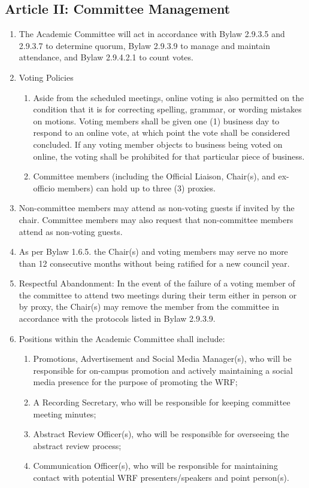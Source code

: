 \subsection{Article II: Committee Management}
\begin{enumerate}[label*=\arabic*., align=left]	
\item The Academic Committee will act in accordance with Bylaw 2.9.3.5 and 2.9.3.7 to determine quorum, Bylaw 2.9.3.9 to manage and maintain attendance, and Bylaw 2.9.4.2.1 to count votes.
\item Voting Policies
\begin{enumerate}[label*=\arabic*., align=left]	
\item Aside from the scheduled meetings, online voting is also permitted on the condition that it is for correcting spelling, grammar, or wording mistakes on motions. Voting members shall be given one (1) business day to respond to an online vote, at which point the vote shall be considered concluded. If any voting member objects to business being voted on online, the voting shall be prohibited for that particular piece of business.
\item Committee members (including the Official Liaison, Chair(s), and ex-officio members) can hold up to three (3) proxies.
\end{enumerate}
\item Non-committee members may attend as non-voting guests if invited by the chair. Committee members may also request that non-committee members attend as non-voting guests.
\item As per Bylaw 1.6.5. the Chair(s) and voting members may serve no more than 12 consecutive months without being ratified for a new council year.
\item Respectful Abandonment: In the event of the failure of a voting member of the committee to attend two meetings during their term either in person or by proxy, the Chair(s) may remove the member from the committee in accordance with the protocols listed in Bylaw 2.9.3.9.
\item Positions within the Academic Committee shall include:
\begin{enumerate}[label*=\arabic*., align=left]
\item Promotions, Advertisement and Social Media Manager(s), who will be responsible for on-campus promotion and actively maintaining a social media presence for the purpose of promoting the WRF; 
\item A Recording Secretary, who will be responsible for keeping committee meeting minutes;
\item Abstract Review Officer(s), who will be responsible for overseeing the abstract review process;
\item Communication Officer(s), who will be responsible for maintaining contact with potential WRF presenters/speakers and point person(s).
\end{enumerate}
\end{enumerate}

